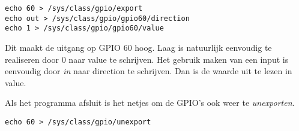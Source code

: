 \begin{verbatim}
echo 60 > /sys/class/gpio/export
echo out > /sys/class/gpio/gpio60/direction
echo 1 > /sys/class/gpio/gpio60/value
\end{verbatim}

Dit maakt de uitgang op GPIO 60 hoog. Laag is natuurlijk eenvoudig te realiseren
door 0 naar value te schrijven.
Het gebruik maken van een input is eenvoudig door \emph{in} naar direction te schrijven.
Dan is de waarde uit te lezen in value.

Als het programma afsluit is het netjes om de GPIO's ook weer te \emph{unexporten}.

\begin{verbatim}
echo 60 > /sys/class/gpio/unexport
\end{verbatim}

